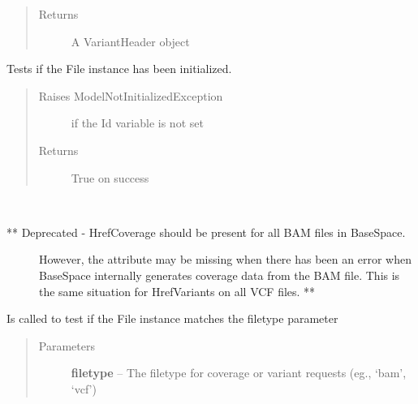 \documentclass[letterpaper,10pt,english]{sphinxmanual}
\begin{document}
\begin{fulllineitems}
\begin{fulllineitems}
\begin{quote}
\begin{description}
\begin{itemize}
\end{itemize}

\item[{Returns}] \leavevmode
A VariantHeader object

\end{description}\end{quote}

\end{fulllineitems}


\begin{fulllineitems}
\label{Available modules:BaseSpacePy.model.File.File.isInit}
Tests if the File instance has been initialized.
\begin{quote}\begin{description}
\item[{Raises ModelNotInitializedException}] \leavevmode
if the Id variable is not set

\item[{Returns}] \leavevmode
True on success

\end{description}\end{quote}

\end{fulllineitems}


\begin{fulllineitems}
\label{Available modules:BaseSpacePy.model.File.File.isValidFileOption}~\begin{description}
\item[{** Deprecated - HrefCoverage should be present for all BAM files in BaseSpace.}] \leavevmode
However, the attribute may be missing when there has been an error
when BaseSpace internally generates coverage data from the BAM file. 
This is the same situation for HrefVariants on all VCF files. **

\end{description}

Is called to test if the File instance matches the filetype parameter
\begin{quote}\begin{description}
\item[{Parameters}] \leavevmode
\textbf{filetype} -- The filetype for coverage or variant requests (eg., `bam', `vcf')

\end{description}\end{quote}

\end{fulllineitems}


\end{fulllineitems}
\end{document}
